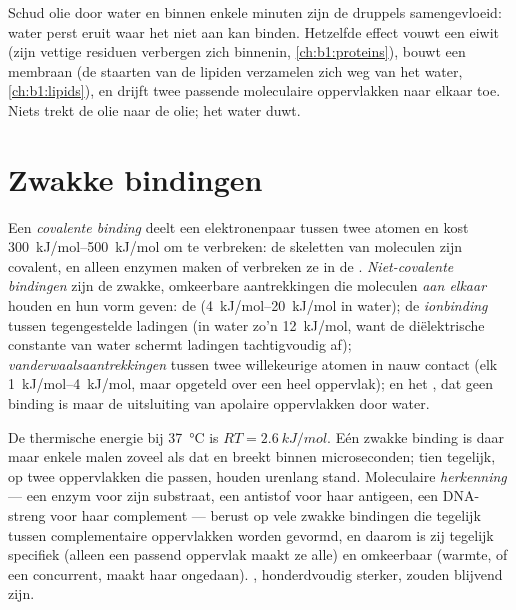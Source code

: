 \begin{example}\label{ex:b1:water-small-molecules:hydrophobic}
Schud olie door water en binnen enkele minuten zijn de druppels samengevloeid:
water perst eruit waar het niet aan kan binden. Hetzelfde effect vouwt een eiwit
(zijn vettige residuen verbergen zich binnenin, \cref{ch:b1:proteins}), bouwt een
membraan (de staarten van de lipiden verzamelen zich weg van het water,
\cref{ch:b1:lipids}), en drijft twee passende moleculaire oppervlakken naar
elkaar toe. Niets trekt de olie naar de olie; het water duwt.
\end{example}

\section{Zwakke bindingen}

\begin{definition}\label{def:b1:water-small-molecules:bonds}
Een \emph{covalente binding} deelt een elektronenpaar
tussen twee atomen en kost \qtyrange{300}{500}{kJ/mol} om te verbreken: de
skeletten van moleculen zijn covalent, en alleen enzymen maken of verbreken ze in
de . \emph{Niet-covalente bindingen} zijn de
zwakke, omkeerbare aantrekkingen die moleculen \emph{aan elkaar} houden en hun
vorm geven: de \emph{} (\qtyrange{4}{20}{kJ/mol} in water); de
\emph{ionbinding} tussen tegengestelde ladingen (in water zo'n
\qty{12}{kJ/mol}, want de diëlektrische constante van water schermt ladingen
tachtigvoudig af); \emph{vanderwaalsaantrekkingen}
tussen twee willekeurige atomen in nauw contact (elk \qtyrange{1}{4}{kJ/mol},
maar opgeteld over een heel oppervlak); en het \emph{}, dat geen
binding is maar de uitsluiting van apolaire oppervlakken door water.
\end{definition}

\begin{proposition}\label{prop:b1:water-small-molecules:weak}
De thermische energie bij \qty{37}{\celsius} is $RT = \qty{2.6}{kJ/mol}$. Eén
zwakke binding is daar maar enkele malen zoveel als dat en breekt binnen
microseconden; tien tegelijk, op twee oppervlakken die passen, houden urenlang
stand. Moleculaire \emph{herkenning} --- een enzym
voor zijn substraat, een antistof voor haar antigeen, een DNA-streng voor haar
complement --- berust op vele zwakke bindingen die tegelijk tussen
complementaire oppervlakken worden gevormd, en daarom is zij tegelijk specifiek
(alleen een passend oppervlak maakt ze alle) en omkeerbaar (warmte, of een
concurrent, maakt haar ongedaan). , honderdvoudig sterker,
zouden blijvend zijn.
\end{proposition}

